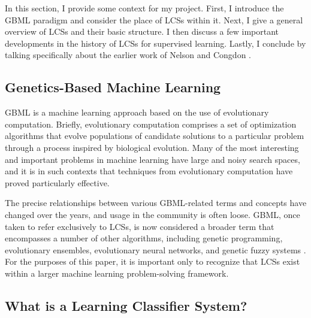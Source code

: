 \documentclass[11pt]{article}
\begin{document}
In this section, I provide some context for my project. First, I introduce the GBML paradigm and consider the place of LCSs within it. Next, I give a general overview of LCSs and their basic structure. I then discuss a few important developments in the history of LCSs for supervised learning. Lastly, I conclude by talking specifically about the earlier work of Nelson and Congdon \cite{nelson_measuring_2016}.

\subsection{Genetics-Based Machine Learning}

GBML is a machine learning approach based on the use of evolutionary computation. Briefly, evolutionary computation comprises a set of optimization algorithms that evolve populations of candidate solutions to a particular problem through a process inspired by biological evolution. Many of the most interesting and important problems in machine learning have large and noisy search spaces, and it is in such contexts that techniques from evolutionary computation have proved particularly effective.

The precise relationships between various GBML-related terms and concepts have changed over the years, and usage in the community is often loose. GBML, once taken to refer exclusively to LCSs, is now considered a broader term that encompasses a number of other algorithms, including genetic programming, evolutionary ensembles, evolutionary neural networks, and genetic fuzzy systems \cite{kovacs_genetics-based_2012}. For the purposes of this paper, it is important only to recognize that LCSs exist within a larger machine learning problem-solving framework.

\subsection{What is a Learning Classifier System?}
\end{document}
